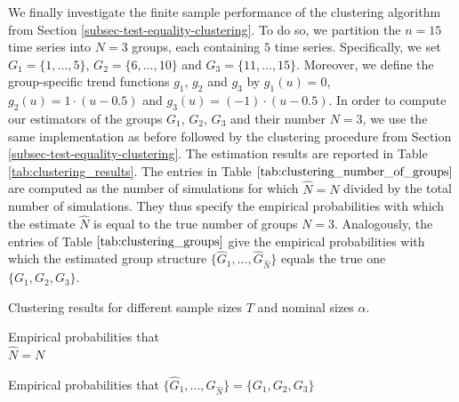 We finally investigate the finite sample performance of the clustering algorithm from Section \ref{subsec-test-equality-clustering}. To do so, we partition the $n = 15$ time series into $N=3$ groups, each containing $5$ time series. Specifically, we set $G_1 = \{1,\ldots,5\}$, $G_2 = \{6,\ldots,10\}$ and $G_3 =  \{11,\ldots,15\}$. Moreover, we define the group-specific trend functions $g_1$, $g_2$ and $g_3$ by $g_1(u) = 0$, $g_2(u) = 1 \cdot (u - 0.5)$ and $g_3(u) =  (- 1) \cdot (u - 0.5)$. In order to compute our estimators of the groups $G_1$, $G_2$, $G_3$ and their number $N = 3$, we use the same implementation as before followed by the clustering procedure from Section \ref{subsec-test-equality-clustering}. The estimation results are reported in Table \ref{tab:clustering_results}. The entries in Table $\ref{tab:clustering_number_of_groups}$ are computed as the number of simulations for which $\widehat{N} = N$ divided by the total number of simulations. They thus specify the empirical probabilities with which the estimate $\widehat{N}$ is equal to the true number of groups $N = 3$. Analogously, the entries of Table $\ref{tab:clustering_groups}$ give the empirical probabilities with which the estimated group structure $\{ \widehat{G}_1,\ldots,\widehat{G}_{\widehat{N}}\}$ equals the true one $\{G_1,G_2,G_3\}$. 


\addtocounter{table}{-1} 
\begin{table}[t]
\footnotesize{
\begin{center}
\caption{Clustering results for different sample sizes $T$ and nominal sizes $\alpha$.}\label{tab:clustering_results}
\begin{subtable}[b]{0.48\textwidth}
\centering
\caption{Empirical probabilities that \\ $\widehat{N} = N$}\label{tab:clustering_number_of_groups}
\renewcommand{\arraystretch}{1.2}

\end{subtable}
\begin{subtable}[b]{0.48\textwidth}
\centering
\caption{\centering Empirical probabilities that $\{ \widehat{G}_1,\ldots,\widehat{G}_{\widehat{N}}\} = \{ G_1,G_2,G_3\}$}\label{tab:clustering_groups}
\renewcommand{\arraystretch}{1.2}

\end{subtable}
\end{center}}
\vspace{-0.5cm}
\end{table}


